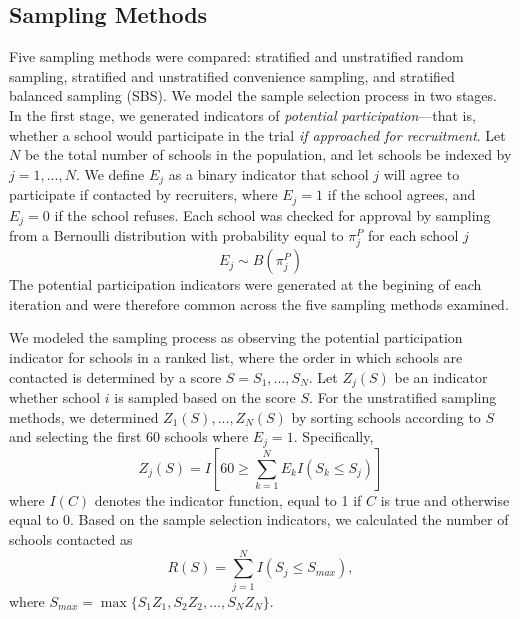 \documentclass[man,floatsintext]{apa6}
\begin{document}
\hypertarget{sampling-methods}{%
\subsection{Sampling Methods}\label{sampling-methods}}

Five sampling methods were compared: stratified and unstratified random sampling, stratified and unstratified convenience sampling, and stratified balanced sampling (SBS). We model the sample selection process in two stages. In the first stage, we generated indicators of \emph{potential participation}---that is, whether a school would participate in the trial \emph{if approached for recruitment}. Let \(N\) be the total number of schools in the population, and let schools be indexed by \(j = 1, ..., N\). We define \(E_j\) as a binary indicator that school \(j\) will agree to participate if contacted by recruiters, where \(E_j = 1\) if the school agrees, and \(E_j = 0\) if the school refuses. Each school was checked for approval by sampling from a Bernoulli distribution with probability equal to \(\pi^P_j\) for each school \(j\)
\begin{equation}
\label{eq:Ej}
E_j \sim B(\pi^P_j)
\end{equation}
The potential participation indicators were generated at the begining of each iteration and were therefore common across the five sampling methods examined.

We modeled the sampling process as observing the potential participation indicator for schools in a ranked list, where the order in which schools are contacted is determined by a score \(S = S_1,...,S_N\). Let \(Z_j(S)\) be an indicator whether school \(i\) is sampled based on the score \(S\).
For the unstratified sampling methods, we determined \(Z_1(S),...,Z_N(S)\) by sorting schools according to \(S\) and selecting the first 60 schools where \(E_j = 1\).
Specifically,
\begin{equation}
\label{eq:Zj}
Z_j(S) = I\left[60 \geq \sum_{k=1}^N E_k I\left(S_k \leq S_j\right)\right]
\end{equation}
where \(I(C)\) denotes the indicator function, equal to 1 if \(C\) is true and otherwise equal to 0. Based on the sample selection indicators, we calculated the number of schools contacted as
\begin{equation}
\label{eq:R}
R(S) = \sum_{j=1}^N I(S_j \leq S_{max}),
\end{equation}
where \(S_{max} = \max \{S_1 Z_1, S_2 Z_2, ..., S_N Z_N\}\).
\end{document}
